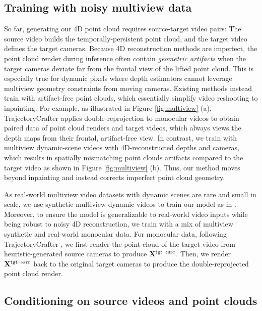 \subsection{Training with noisy multiview data}
\label{sec:method:multiview}

So far, generating our 4D point cloud requires source-target video pairs: The source video builds the temporally-persistent point cloud, and the target video defines the target cameras. Because 4D reconstruction methods are imperfect, the point cloud render during inference often contain \emph{geometric artifacts} when the target cameras deviate far from the frontal view of the lifted point cloud. This is especially true for dynamic pixels where depth estimators cannot leverage multiview geometry constraints from moving cameras. Existing methods \cite{yu2025trajcraft, ren2025gen3c, hu2025ex4d} instead train with artifact-free point clouds, which essentially simplify video reshooting to inpainting. For example, as illustrated in Figure \ref{fig:multiview} (a), TrajectoryCrafter \cite{yu2025trajcraft} applies double-reprojection to monocular videos to obtain paired data of point cloud renders and target videos, which always views the depth maps from their frontal, artifact-free view. In contrast, we train with multiview dynamic-scene videos with 4D-reconstructed depths and cameras, which results in spatially mismatching point clouds artifacts compared to the target video as shown in Figure \ref{fig:multiview} (b). Thus, our method moves beyond inpainting and instead corrects imperfect point cloud geometry.

As real-world multiview video datasets with dynamic scenes are rare and small in scale, we use synthetic multiview dynamic videos to train our model as in \cite{bai2025recammaster}. Moreover, to ensure the model is generalizable to real-world video inputs while being robust to noisy 4D reconstruction, we train with a mix of multiview synthetic and real-world monocular data. For monocular data, following TrajectoryCrafter \cite{yu2025trajcraft}, we first render the point cloud of the target video from heuristic-generated source cameras to produce $\mathbf{X}^{\mathrm{tgt \to src}}$. Then, we render $\mathbf{X}^{\mathrm{tgt \to src}}$ back to the original target cameras to produce the double-reprojected point cloud render.

\subsection{Conditioning on source videos and point clouds}
\label{sec:method:source}

